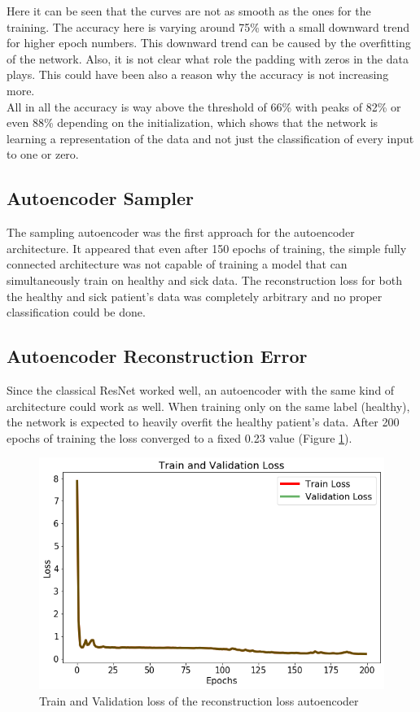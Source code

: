 \documentclass[journal]{IEEEtran}
\begin{document}
Here it can be seen that the curves are not as smooth as the ones for the training. The accuracy here is varying around 75\% with a small downward trend for higher epoch numbers. This downward trend can be caused by the overfitting of the network. Also, it is not clear what role the padding with zeros in the data plays. This could have been also a reason why the accuracy is not increasing more.\\All in all the accuracy is way above the threshold of 66\% with peaks of 82\% or even 88\% depending on the initialization, which shows that the network is learning a representation of the data and not just the classification of every input to one or zero.

\subsection{Autoencoder Sampler}
The sampling autoencoder was the first approach for the autoencoder architecture. It appeared that even after 150 epochs of training, the simple fully connected architecture was not capable of training a model that can simultaneously train on healthy and sick data. The reconstruction loss for both the healthy and sick patient's data was completely arbitrary and no proper classification could be done.

\subsection{Autoencoder Reconstruction Error}
Since the classical ResNet worked well, an autoencoder with the same kind of architecture could work as well. When training only on the same label (healthy), the network is expected to heavily overfit the healthy patient's data. After 200 epochs of training the loss converged to a fixed 0.23 value (Figure \ref{fig:ac_loss}).

\begin{figure}
\centering
\includegraphics[width=1\linewidth]{../imgs/ac_loss}
\caption{Train and Validation loss of the reconstruction loss autoencoder}
\label{fig:ac_loss}
\end{figure}
\end{document}
